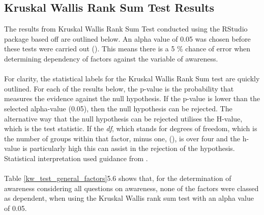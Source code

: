 \subsection{Kruskal Wallis Rank Sum Test Results}
The results from Kruskal Wallis Rank Sum Test conducted using the RStudio package based off \cite{hollander_nonparametric_2014} are outlined below.  An alpha value of 0.05 was chosen before these tests were carried out (\cite{hollander_nonparametric_2014}). This means there is a 5 \% chance of error when determining dependency of factors against the variable of awareness.
\paragraph{}
For clarity, the statistical labels for the Kruskal Wallis Rank Sum test are quickly outlined. For each of the results below, the p-value is the probability that measures the evidence against the null hypothesis.  If the p-value is lower than the selected alpha-value (0.05), then the null hypothesis can be rejected. The alternative way that the null hypothesis can be rejected utilises the H-value, which is the test statistic. If the \textit{df}, which stands for degrees of freedom, which is the number of groups within that factor, minus one, (\cite{minitab_interpret_2022}), is over four and the h-value is particularly high this can assist in the rejection of the hypothesis. Statistical interpretation used guidance from \cite{minitab_interpret_2022}.
\paragraph{}

Table \ref{kw_test_general_factors}5.6 shows that, for the determination of awareness considering all questions on awareness, none of the factors were classed as dependent, when using the Kruskal Wallis rank sum test with an alpha value of 0.05. 

